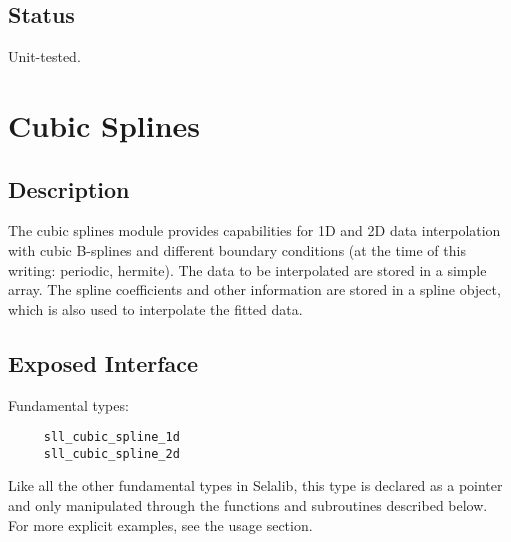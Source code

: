 \documentclass[]{report}   %
\begin{document}
\subsection{Status}
Unit-tested.





\section{Cubic Splines}

\subsection{Description}
The cubic splines module provides capabilities for 1D and 2D data interpolation with cubic B-splines and different boundary conditions (at the time of this writing: periodic, hermite). The data to be interpolated are stored in a simple array.  The spline coefficients and other information are stored in a spline object, which is also used to interpolate the fitted data.

\subsection{Exposed Interface}
Fundamental types:
\begin{verbatim}
     sll_cubic_spline_1d
     sll_cubic_spline_2d
\end{verbatim}
Like all the other fundamental types in Selalib, this type is declared as a pointer and only manipulated through the functions and subroutines described below. For more explicit examples, see the usage section.
\end{document}
